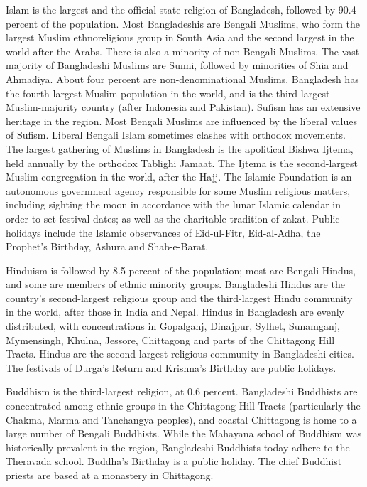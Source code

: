 Islam is the largest and the official state religion of Bangladesh,
followed by 90.4 percent of the population. Most Bangladeshis are
Bengali Muslims, who form the largest Muslim ethnoreligious group in
South Asia and the second largest in the world after the Arabs. There is
also a minority of non-Bengali Muslims. The vast majority of Bangladeshi
Muslims are Sunni, followed by minorities of Shia and Ahmadiya. About
four percent are non-denominational Muslims. Bangladesh has the
fourth-largest Muslim population in the world, and is the third-largest
Muslim-majority country (after Indonesia and Pakistan). Sufism has an
extensive heritage in the region. Most Bengali Muslims are influenced by
the liberal values of Sufism. Liberal Bengali Islam sometimes clashes
with orthodox movements. The largest gathering of Muslims in Bangladesh
is the apolitical Bishwa Ijtema, held annually by the orthodox Tablighi
Jamaat. The Ijtema is the second-largest Muslim congregation in the
world, after the Hajj. The Islamic Foundation is an autonomous
government agency responsible for some Muslim religious matters,
including sighting the moon in accordance with the lunar Islamic
calendar in order to set festival dates; as well as the charitable
tradition of zakat. Public holidays include the Islamic observances of
Eid-ul-Fitr, Eid-al-Adha, the Prophet's Birthday, Ashura and
Shab-e-Barat.

Hinduism is followed by 8.5 percent of the population; most are Bengali
Hindus, and some are members of ethnic minority groups. Bangladeshi
Hindus are the country's second-largest religious group and the
third-largest Hindu community in the world, after those in India and
Nepal. Hindus in Bangladesh are evenly distributed, with concentrations
in Gopalganj, Dinajpur, Sylhet, Sunamganj, Mymensingh, Khulna, Jessore,
Chittagong and parts of the Chittagong Hill Tracts. Hindus are the
second largest religious community in Bangladeshi cities. The festivals
of Durga's Return and Krishna's Birthday are public holidays.

Buddhism is the third-largest religion, at 0.6 percent. Bangladeshi
Buddhists are concentrated among ethnic groups in the Chittagong Hill
Tracts (particularly the Chakma, Marma and Tanchangya peoples), and
coastal Chittagong is home to a large number of Bengali Buddhists. While
the Mahayana school of Buddhism was historically prevalent in the
region, Bangladeshi Buddhists today adhere to the Theravada school.
Buddha's Birthday is a public holiday. The chief Buddhist priests are
based at a monastery in Chittagong.

